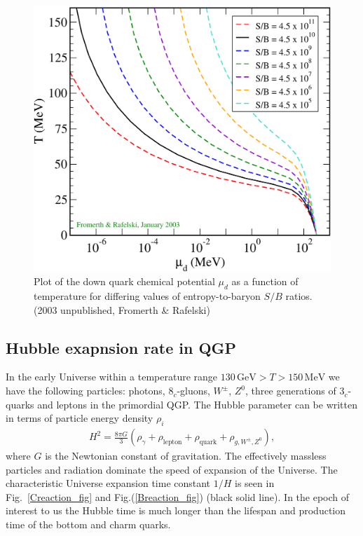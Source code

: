 \documentclass[universe,article,submit,moreauthors,pdftex,a4paper]{Definitions/mdpi}
\begin{document}
\begin{figure}[h]
  \centering
  \includegraphics[width=\linewidth]{./extra/Tmud1.pdf}
  \caption{Plot of the down quark chemical potential $\mu_{d}$ as a function of temperature for differing values of entropy-to-baryon $S/B$ ratios. (2003 unpublished, Fromerth \& Rafelski) \cite{Rafelski:2019twp}}
  \label{QGPchem2} 
\end{figure}

\subsection {Hubble exapnsion rate in QGP}
In the early Universe within a temperature range $130\, \mathrm{GeV}>T>150\, \mathrm{MeV}$  we have the following particles:  photons, $8_c$-gluons, $W^\pm$, $Z^0$, three generations of $3_c$-quarks and leptons  in the primordial QGP.  The Hubble parameter can be written in terms of particle energy density $\rho_i$
\begin{align}
H^2=\frac{8\pi G}{3}\left(\rho_\gamma+\rho_{\mathrm{lepton}}+\rho_{\mathrm{quark}}+\rho_{g,{W^\pm},{Z^0}}\right),
\end{align}
where $G$ is the Newtonian constant of gravitation. The effectively massless particles and radiation dominate the speed of expansion of the Universe. The characteristic Universe expansion time constant $1/H$ is seen in Fig.~\ref{Creaction_fig} and Fig.(\ref{Breaction_fig}) (black solid line). In the epoch of interest to us the Hubble time is much longer than the lifespan and production time of the bottom and charm quarks.
\end{document}
